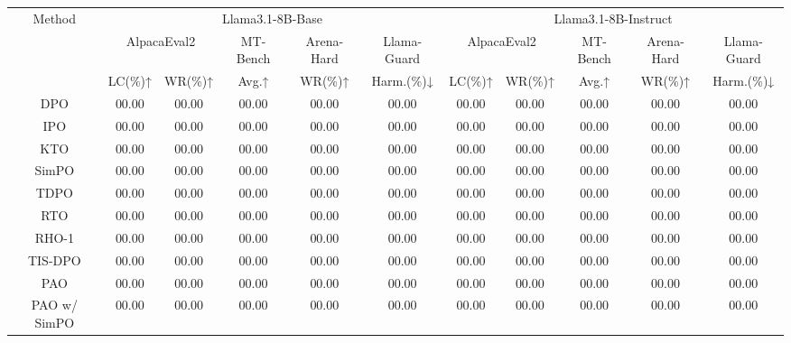 \begin{table}[]
\setlength{\tabcolsep}{1.5pt}
\small
\begin{tabular}{cccccc|ccccc}
\hline
\multirow{3}{*}{Method} & \multicolumn{5}{c|}{Llama3.1-8B-Base}                                 & \multicolumn{5}{c}{Llama3.1-8B-Instruct}                                  \\ \cline{2-11} 
                        & \multicolumn{2}{c}{AlpacaEval2} & MT-Bench & Arena-Hard & Llama-Guard & \multicolumn{2}{c}{AlpacaEval2} & MT-Bench & Arena-Hard & Llama-Guard \\ \cline{2-11} 
                        & LC(\%)↑        & WR(\%)↑        & Avg.↑    & WR(\%)↑    & Harm.(\%)↓  & LC(\%)↑        & WR(\%)↑        & Avg.↑    & WR(\%)↑    & Harm.(\%)↓  \\ \hline
DPO                     & 00.00          & 00.00          & 00.00    & 00.00      & 00.00       & 00.00          & 00.00          & 00.00    & 00.00      & 00.00       \\
IPO                     & 00.00          & 00.00          & 00.00    & 00.00      & 00.00       & 00.00          & 00.00          & 00.00    & 00.00      & 00.00       \\
KTO                     & 00.00          & 00.00          & 00.00    & 00.00      & 00.00       & 00.00          & 00.00          & 00.00    & 00.00      & 00.00       \\
SimPO                   & 00.00          & 00.00          & 00.00    & 00.00      & 00.00       & 00.00          & 00.00          & 00.00    & 00.00      & 00.00       \\
TDPO                    & 00.00          & 00.00          & 00.00    & 00.00      & 00.00       & 00.00          & 00.00          & 00.00    & 00.00      & 00.00       \\
RTO                     & 00.00          & 00.00          & 00.00    & 00.00      & 00.00       & 00.00          & 00.00          & 00.00    & 00.00      & 00.00       \\
RHO-1                   & 00.00          & 00.00          & 00.00    & 00.00      & 00.00       & 00.00          & 00.00          & 00.00    & 00.00      & 00.00       \\
TIS-DPO                 & 00.00          & 00.00          & 00.00    & 00.00      & 00.00       & 00.00          & 00.00          & 00.00    & 00.00      & 00.00       \\
\hline
PAO                     & 00.00          & 00.00          & 00.00    & 00.00      & 00.00       & 00.00          & 00.00          & 00.00    & 00.00      & 00.00       \\
PAO w/ SimPO            & 00.00          & 00.00          & 00.00    & 00.00      & 00.00       & 00.00          & 00.00          & 00.00    & 00.00      & 00.00       \\ \hline
\end{tabular}
\end{table}